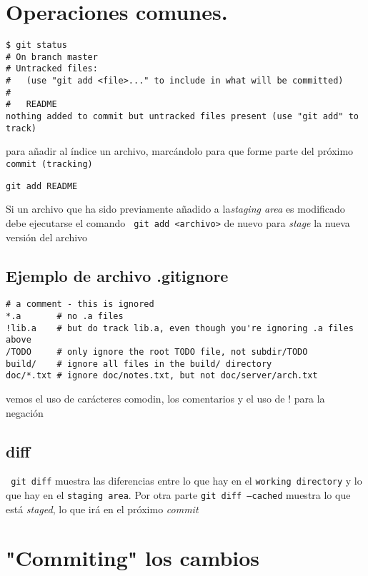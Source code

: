 \documentclass[]{article}
\title{}
\author{}
\begin{document}
\section*{Operaciones comunes.}
\begin{verbatim}
$ git status
# On branch master
# Untracked files:
#   (use "git add <file>..." to include in what will be committed)
#
#	README
nothing added to commit but untracked files present (use "git add" to track)
\end{verbatim}

para añadir al índice un archivo, marcándolo para que forme parte del próximo \texttt{commit (tracking)
}
\begin{verbatim}
git add README
\end{verbatim}

Si un archivo que ha sido previamente añadido a la\textit{staging area} es modificado debe ejecutarse el comando \verb= git add <archivo>= de nuevo para \textit{stage} la nueva versión del archivo 

\subsection*{Ejemplo de archivo .gitignore}
\begin{verbatim}
# a comment - this is ignored
*.a       # no .a files
!lib.a    # but do track lib.a, even though you're ignoring .a files above
/TODO     # only ignore the root TODO file, not subdir/TODO
build/    # ignore all files in the build/ directory
doc/*.txt # ignore doc/notes.txt, but not doc/server/arch.txt
\end{verbatim}

vemos el uso de carácteres comodin, los comentarios y el uso de ! para la negación

\subsection*{diff}

\verb= git diff= muestra las diferencias entre lo que hay en el \texttt{working directory} y lo que hay en el \texttt{staging area}. Por otra parte \texttt{git diff --cached} muestra lo que está \textit{staged}, lo que irá en el próximo \textit{commit} 

\section*{"Commiting" los cambios}
\end{document}
